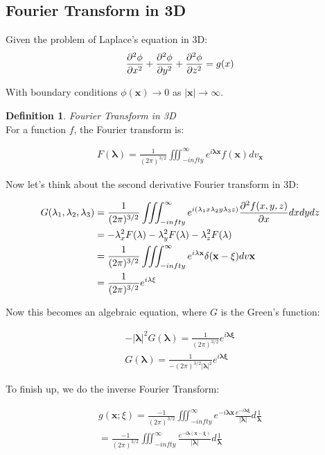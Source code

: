 \documentclass{article}
\theoremstyle{definition}
\newtheorem{definition}{Definition}[section]
\newcommand{\Def}[2]{
\begin{shaded*}
\begin{definition}{\textit{#1}}\\#2\end{definition}
\end{shaded*}
}
\begin{document}
\subsection{Fourier Transform in 3D}
Given the problem of Laplace's equation in 3D:
\begin{align*}
\pdv{^2\phi}{x^2} + \pdv{^2\phi}{y^2} + \pdv{^2\phi}{z^2} = g(x)
\end{align*}

With boundary conditions $\phi(\mathbf{x}) \to 0$ as $|\mathbf{x}| \to \infty$. 

\Def{Fourier Transform in 3D}{
For a function $f$, the Fourier transform is:

\begin{align*}
F(\mathbf{\lambda}) = \frac{1}{(2 \pi)^{3/2}} \iiint_{-infty}^\infty e^{i \mathbf{\lambda x}} f(\mathbf{x}) dv_\mathbf{x}
\end{align*}
}

Now let's think about the second derivative Fourier transform in 3D:

\begin{align*}
G(\lambda_1, \lambda_2, \lambda_3) &= \frac{1}{(2 \pi)^{3/2}} \iiint_{-infty}^\infty e^{i (\lambda_1 x \lambda_2 y \lambda_3 z)} \pdv{^2 f(x,y,z)}{x} dxdydz \\ 
&= -\lambda_x^2 F(\mathbf{\lambda}) -\lambda_y^2 F(\mathbf{\lambda}) -\lambda_z^2 F(\mathbf{\lambda}) \\
&= \frac{1}{(2 \pi)^{3/2}} \iiint_{-infty}^\infty e^{i \mathbf{\lambda x}} \delta(\mathbf{x} - \mathbf{\xi}) dv\mathbf{x} \\ 
& = \frac{1}{(2 \pi)^{3/2}} e^{i \mathbf{\lambda \xi}}
\end{align*}

Now this becomes an algebraic equation, where $G$ is the Green's function:

\begin{align*}
-|\mathbf{\lambda}|^2 G(\mathbf{\mathbf{\lambda}}) = \frac{1}{(2 \pi)^{3/2}}  e^{i \mathbf{\lambda \xi}} \\
G(\mathbf{\lambda}) = \frac{1}{-(2 \pi)^{3/2}|\mathbf{\lambda}|^2}  e^{i \mathbf{\lambda \xi}} 
\end{align*}

To finish up, we do the inverse Fourier Transform:

\begin{align*}
g(\mathbf{x};\xi) = \frac{-1}{(2 \pi)^{3/2}} \iiint_{-infty}^\infty e^{-i  \mathbf{\lambda x}} \frac{e^{-i  \mathbf{\lambda \xi}}}{|\mathbf{\lambda}|} d\frac{1}{\mathbf{\lambda}} \\ 
= \frac{-1}{(2 \pi)^{3/2}} \iiint_{-infty}^\infty \frac{e^{-i  \mathbf{\lambda} (\mathbf{x} - \mathbf{\xi})}}{|\mathbf{\lambda}|} d\frac{1}{\mathbf{\lambda}} \\ 
\end{align*}
\end{document}
